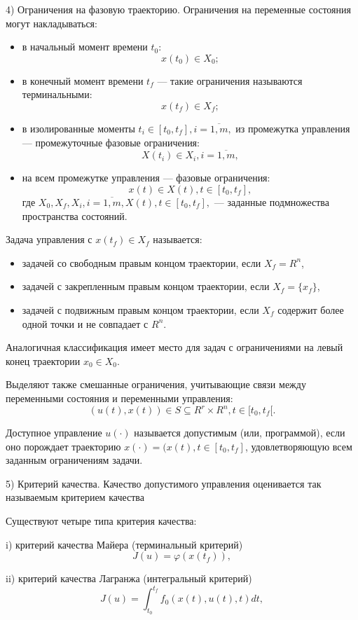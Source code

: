 4) Ограничения на фазовую траекторию. Ограничения на переменные состояния могут накладываться:\begin{itemize}
\item в начальный момент времени $t_{0}$:
$$x(t_{0}) \in X_{0};$$
\item в конечный момент времени $t_{f}$ --- такие ограничения называются терминальными: $$x(t_{f}) \in X_{f};$$
\item в изолированные моменты $t_{i} \in [t_{0},t_{f}], i = \overline{1,m},$ из промежутка управления — промежуточные фазовые ограничения:
$$X(t_{i}) \in X_{i},i = \overline{1,m},$$
\item на всем промежутке управления — фазовые ограничения:
$$x(t) \in X(t),t \in [t_{0},t_{f}],$$ где $X_{0}, X_{f}, X_{i}, i = \overline{1,m}, X(t), t \in [t_0,t_f],$ — заданные подмножества пространства состояний.
\end{itemize}
 Задача управления с $x(t_f) \in X_f $ называется:\begin{itemize}
  \item задачей со свободным правым концом траектории, если
 $X_f = R^n$, \item задачей с закрепленным правым концом траектории, если $X_{f} = \{x_{f}\}$, \item задачей с подвижным правым концом траектории, если $X_{f}$ содержит более одной точки и не совпадает с $R^{n}$.
\end{itemize}
 Аналогичная классификация имеет место для задач с ограничениями на левый конец траектории $x_{0} \in X_{0}$.

  Выделяют также смешанные ограничения, учитывающие связи между переменными состояния и переменными управления:
$$(u(t),x(t)) \in S \subseteq R^r \times R^n,t \in [t_{0},t_{f}[.$$ \begin{definition} Доступное управление $u(\cdot)$ называется допустимым (или, программой), если оно порождает траекторию $x(\cdot)=(x(t), t \in [t_0,t_f]$, удовлетворяющую всем заданным ограничениям задачи. \end{definition}

5) Критерий качества. Качество допустимого управления оценивается так называемым критерием качества

 Существуют четыре типа критерия качества:

i) критерий качества Майера (терминальный критерий)
$$J(u) = \varphi(x(t_{f})),$$

ii) критерий качества Лагранжа (интегральный критерий)
$$J(u) =\int^{t_{f}}_{ t_{0}}
f_{0}(x(t),u(t),t)dt,$$

